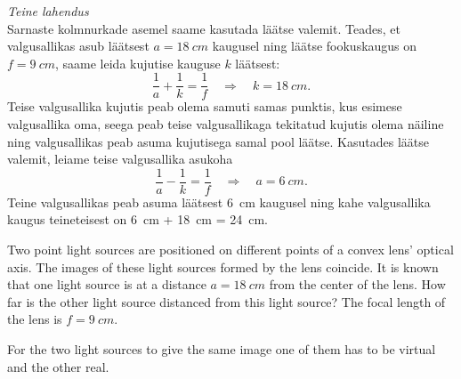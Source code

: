 {\vspace{\baselineskip}
\emph{Teine lahendus}\\
Sarnaste kolmnurkade asemel saame kasutada läätse valemit. Teades, et valgusallikas asub läätsest $a = \SI{18}{cm}$ kaugusel ning läätse fookuskaugus on $f=\SI{9}{cm}$, saame leida kujutise kauguse $k$ läätsest:
\[ \frac{1}{a} + \frac{1}{k} = \frac{1}{f} \quad\Rightarrow\quad k = \SI{18}{cm}. \]
Teise valgusallika kujutis peab olema samuti samas punktis, kus esimese valgusallika oma, seega peab teise valgusallikaga tekitatud kujutis olema näiline ning valgusallikas peab asuma kujutisega samal pool läätse. Kasutades läätse valemit, leiame teise valgusallika asukoha
\[ \frac{1}{a} - \frac{1}{k} = \frac{1}{f} \quad\Rightarrow\quad a = \SI{6}{cm}. \]
Teine valgusallikas peab asuma läätsest \SI{6}{cm} kaugusel ning kahe valgusallika kaugus teineteisest on \SI{6}{cm} + \SI{18}{cm} = \SI{24}{cm}.
\fi


\ifEngStatement
Two point light sources are positioned on different points of a convex lens’ optical axis. The images of these light sources formed by the lens coincide. It is known that one light source is at a distance $a=\SI{18}{cm}$ from the center of the lens. How far is the other light source distanced from this light source? The focal length of the lens is $f=\SI{9}{cm}$.
\fi


\ifEngHint
For the two light sources to give the same image one of them has to be virtual and the other real.
\fi


}
